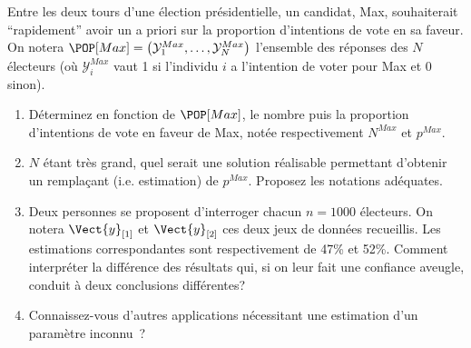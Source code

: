 \documentclass[10pt]{report}
\begin{document}
\begin{exercice}

Entre les deux tours d'une élection présidentielle, un candidat, Max, souhaiterait ``rapidement'' avoir un a priori sur la proportion d'intentions de vote en sa faveur. On notera $\POP[Max]=\left( \mathcal{Y}_1^{Max},\ldots, \mathcal{Y}_N^{Max}\right)$ l'ensemble des réponses des $N$ électeurs (où $\mathcal{Y}_i^{Max}$ vaut 1 si l'individu $i$ a l'intention de voter pour Max et 0 sinon).

\begin{enumerate}
\item Déterminez en fonction de $\POP[Max]$, le nombre puis la proportion d'intentions de vote en faveur de Max, notée respectivement $N^{Max}$ et $p^{Max}$.

\item $N$ étant très grand, quel serait une solution réalisable permettant d'obtenir un remplaçant (i.e. estimation) de $p^{Max}$. Proposez les notations adéquates.

\item Deux personnes se proposent d'interroger chacun $n=1000$ électeurs. On notera $\Vect{y}_{[1]}$ et $\Vect{y}_{[2]}$ ces deux jeux de données recueillis. Les estimations correspondantes sont respectivement de 47\% et 52\%. Comment interpréter la différence des résultats qui, si on leur fait une confiance aveugle, conduit à deux conclusions différentes?

\item Connaissez-vous d'autres applications nécessitant une estimation d'un paramètre inconnu~?

\end{enumerate}
\end{exercice}
\end{document}
